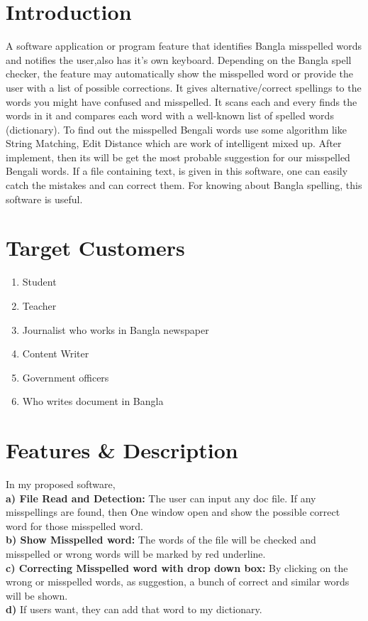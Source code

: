 \documentclass[12pt,letterpaper]{article}
\begin{document}
\begin{flushleft}
\section{Introduction}
A software application or program feature that identifies Bangla misspelled words and notifies the user,also has it's own keyboard.
Depending on the Bangla spell checker, the feature may automatically show the misspelled word or
provide the user with a list of possible corrections. It gives alternative/correct spellings to the words
you might have confused and misspelled. It scans each and every finds the words in it and compares
each word with a well-known list of spelled words (dictionary). To find out the misspelled Bengali
words use some algorithm like String Matching, Edit Distance which are work of intelligent mixed up.
After implement, then its will be get the most probable suggestion for our misspelled Bengali words. If
a file containing text, is given in this software, one can easily catch the mistakes and can correct them.
For knowing about Bangla spelling, this software is useful.


\section{Target Customers}
\begin{enumerate}
  \item Student 
  \item Teacher 
  \item Journalist who works in Bangla newspaper 
  \item Content Writer 
  \item Government officers 
  \item Who writes document in Bangla 
\end{enumerate}

\section{Features \& Description}
In my proposed software,\\
\textbf{a) File Read and Detection:} The user can input any doc file. If any misspellings are found, then
One window open and show the possible correct word for those misspelled word.\\
\textbf{b) Show Misspelled word:} The words of the file will be checked and misspelled or wrong words
will be marked by red underline.\\
\textbf{c) Correcting Misspelled word with drop down box:} By clicking on the wrong or misspelled
words, as suggestion, a bunch of correct and similar words will be shown.\\
\textbf{d)} If users want, they can add that word to my dictionary.

\end{flushleft}
\end{document}

